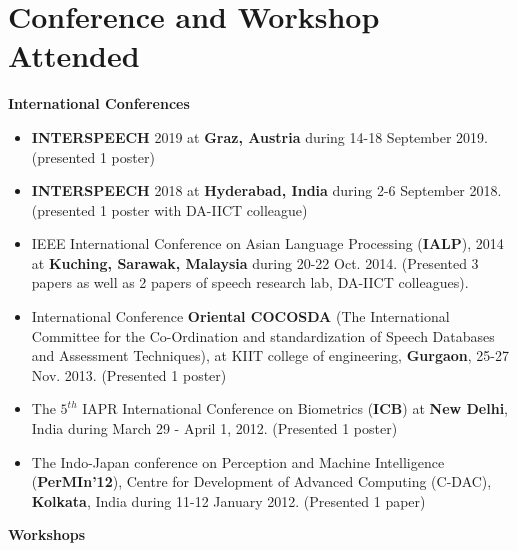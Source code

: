 \documentclass[10pt]{article}
\begin{document}
\section*{Conference and Workshop Attended}
\textbf{International Conferences}
\begin{itemize}
\setlength\itemsep{0.25em}
\item \textbf{INTERSPEECH} 2019 at \textbf{Graz, Austria} during 14-18 September 2019. (presented 1 poster) 
\item \textbf{INTERSPEECH} 2018 at \textbf{Hyderabad, India} during 2-6 September 2018. (presented 1 poster with DA-IICT colleague)
\item IEEE International Conference on Asian Language Processing  (\textbf{IALP}), 2014 at \textbf{Kuching, Sarawak, Malaysia} during 20-22 Oct. 2014. (Presented 3 papers as well as 2 papers of speech research lab, DA-IICT colleagues).
\item International Conference  \textbf{Oriental COCOSDA} (The International Committee for the Co-Ordination and standardization of Speech Databases and Assessment Techniques), at KIIT college of engineering, \textbf{Gurgaon}, 25-27 Nov. 2013.  (Presented 1 poster)
\item The $ 5^{th} $  IAPR International Conference on Biometrics (\textbf{ICB}) at \textbf{New Delhi}, India during March 29 - April 1, 2012. (Presented 1 poster)
\item The Indo-Japan conference on Perception and Machine Intelligence (\textbf{PerMIn'12}), Centre for Development of Advanced Computing (C-DAC), \textbf{Kolkata}, India during 11-12 January 2012. (Presented 1 paper)
\end{itemize}
\textbf{Workshops}
\end{document}
